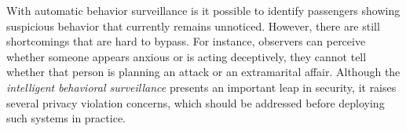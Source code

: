 {%


%

With automatic behavior surveillance is it possible to identify passengers showing suspicious behavior that currently remains unnoticed. However, there are still shortcomings that are hard to bypass. For instance, observers can perceive whether someone appears anxious or is acting deceptively, they cannot tell whether that person is planning an attack or an extramarital affair. Although the \emph{intelligent behavioral surveillance} presents an important leap in security, it raises several privacy violation concerns, which should be addressed before deploying such systems in practice.




}
